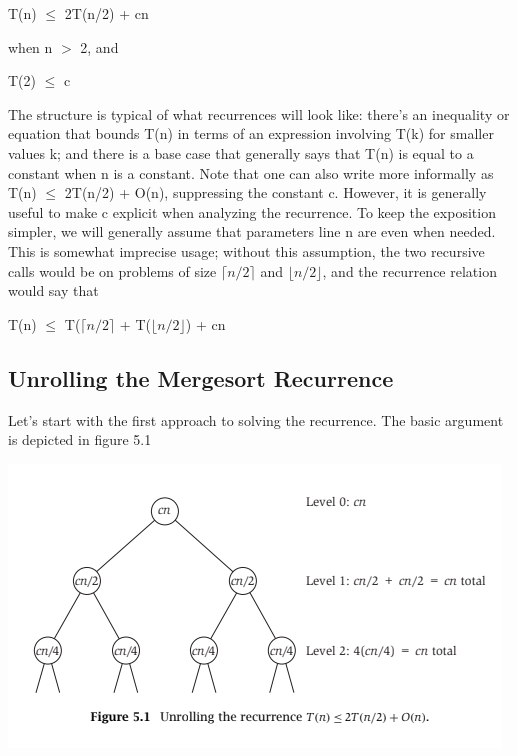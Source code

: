 \documentclass{article}
\begin{document}
\begin{center}
    T(n) $\le$ 2T(n/2) + cn
\end{center}

\medskip

when n $>$ 2, and

\medskip

\begin{center}
    T(2) $\le$ c
\end{center}

\medskip

The structure is typical of what recurrences will look like: there's an inequality or equation that bounds T(n) in terms of an expression involving T(k) for smaller values k; and there is a base case that generally says that T(n) is equal to a constant when n is a constant. Note that one can also write more informally as T(n) $\le$ 2T(n/2) + O(n), suppressing the constant c. However, it is generally useful to make c explicit when analyzing the recurrence.
\medskip
To keep the exposition simpler, we will generally assume that parameters line n are even when needed. This is somewhat imprecise usage; without this assumption, the two recursive calls would be on problems of size $\lceil n/2 \rceil$ and $\lfloor n/2 \rfloor$, and the recurrence relation would say that
\medskip
\begin{center}
    T(n) $\le$ T($\lceil n/2 \rceil$ + T($\lfloor n/2 \rfloor$) + cn
\end{center}

\subsection{Unrolling the Mergesort Recurrence}

Let's start with the first approach to solving the recurrence. The basic argument is depicted in figure 5.1

\includegraphics[]{figures/fig1.png}
\end{document}
